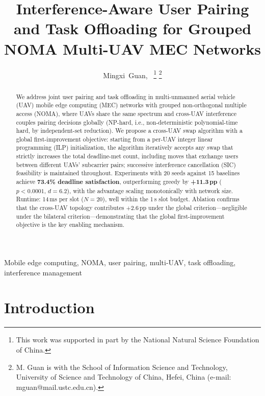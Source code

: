 \documentclass[journal]{IEEEtran}
\begin{document}
\title{Interference-Aware User Pairing and Task Offloading for Grouped NOMA Multi-UAV MEC Networks}

\author{Mingxi~Guan,~\IEEEmembership{}
\thanks{This work was supported in part by the National Natural Science Foundation of China. }
\thanks{M. Guan is with the School of Information Science and Technology, University of Science and Technology of China, Hefei, China (e-mail: mguan@mail.ustc.edu.cn).}}

\maketitle

\begin{abstract}
We address joint user pairing and task offloading in multi-unmanned aerial vehicle (UAV) mobile edge computing (MEC) networks with grouped non-orthogonal multiple access (NOMA), where UAVs share the same spectrum and cross-UAV interference couples pairing decisions globally (NP-hard, i.e., non-deterministic polynomial-time hard, by independent-set reduction).
We propose a cross-UAV swap algorithm with a global first-improvement objective: starting from a per-UAV integer linear programming (ILP) initialization, the algorithm iteratively accepts any swap that strictly increases the total deadline-met count, including moves that exchange users between different UAVs' subcarrier pairs; successive interference cancellation (SIC) feasibility is maintained throughout.
Experiments with 20 seeds against 15 baselines achieve \textbf{73.4\% deadline satisfaction}, outperforming greedy by \textbf{+11.3\,pp} ($p<0.0001$, $d=6.2$), with the advantage scaling monotonically with network size.
Runtime: 14\,ms per slot ($N\!=\!20$), well within the 1\,s slot budget.
Ablation confirms that the cross-UAV topology contributes +2.6\,pp under the global criterion---negligible under the bilateral criterion---demonstrating that the global first-improvement objective is the key enabling mechanism.
\end{abstract}

\begin{IEEEkeywords}
Mobile edge computing, NOMA, user pairing, multi-UAV, task offloading, interference management
\end{IEEEkeywords}

\section{Introduction}
\label{sec:intro}
\end{document}
